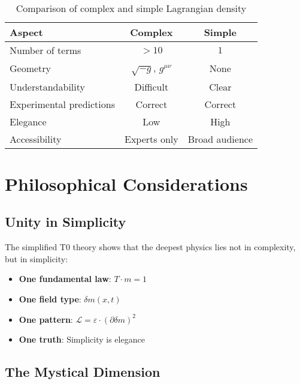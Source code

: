 \documentclass[12pt,a4paper]{article}
\newcommand{\deltam}{\delta m}
\newcommand{\Lag}{\mathcal{L}}
\theoremstyle{definition}
\theoremstyle{remark}
\begin{document}
	\begin{table}[htbp]
		\centering
		\begin{tabular}{lcc}
			\toprule
			\textbf{Aspect} & \textbf{Complex} & \textbf{Simple} \\
			\midrule
			Number of terms & $>10$ & $1$ \\
			Geometry & $\sqrt{-g}$, $g^{\mu\nu}$ & None \\
			Understandability & Difficult & Clear \\
			Experimental predictions & Correct & Correct \\
			Elegance & Low & High \\
			Accessibility & Experts only & Broad audience \\
			\bottomrule
		\end{tabular}
		\caption{Comparison of complex and simple Lagrangian density}
		\label{tab:complexity_comparison}
	\end{table}
	
	\section{Philosophical Considerations}
	
	\subsection{Unity in Simplicity}
	
	\begin{tcolorbox}[colback=green!5!white,colframe=green!75!black,title=Philosophical Insight]
		The simplified T0 theory shows that the deepest physics lies not in complexity, but in simplicity:
		
		\begin{itemize}
			\item \textbf{One fundamental law}: $T \cdot m = 1$
			\item \textbf{One field type}: $\deltam(x,t)$
			\item \textbf{One pattern}: $\Lag = \varepsilon \cdot (\partial \deltam)^2$
			\item \textbf{One truth}: Simplicity is elegance
		\end{itemize}
	\end{tcolorbox}
	
	\subsection{The Mystical Dimension}
	
\end{document}
